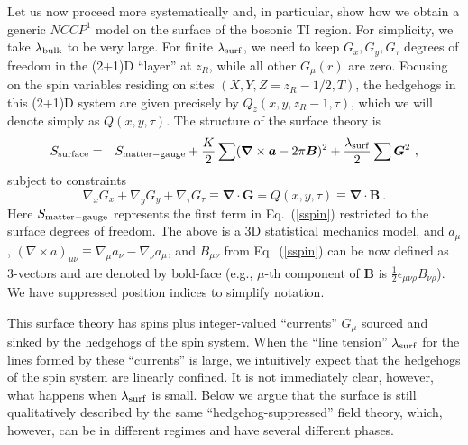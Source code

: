 Let us now proceed more systematically and, in particular, show how we obtain a generic $NCCP^1$ model on the surface of the bosonic TI region.  For simplicity, we take $\lambda_{\rm bulk}$ to be very large. For finite $\lambda_{\rm surf}$, we need to keep $G_x, G_y, G_\tau$ degrees of freedom in the (2+1)D ``layer'' at $z_R$, while all other $G_\mu(r)$ are zero.  Focusing on the spin variables residing on sites $(X, Y, Z=z_R-1/2, T)$, the hedgehogs in this (2+1)D system are given precisely by $Q_z(x, y, z_R-1, \tau)$, which we will denote simply as $Q(x, y, \tau)$.  The structure of the surface theory is
\begin{eqnarray}
S_{\rm surface} &=& S_{\rm matter-gauge} + \frac{K}{2}\sum  ({\bm\nabla} \times {\bm a} - 2\pi {\bm B})^2
+ \frac{\lambda_{\rm surf}}{2}\sum  {\bm G}^2 ~,
\label{Ssurf}
\end{eqnarray}
subject to constraints
\begin{equation}
 \nabla_x G_x + \nabla_y G_y + \nabla_\tau G_\tau \equiv {\bm \nabla} \cdot {\bm G} = Q(x,y,\tau) \equiv {\bm \nabla} \cdot {\bm B} ~.
\end{equation}
Here $S_{\rm matter-gauge}$ represents the first term in Eq.~(\ref{sspin}) restricted to the surface degrees of freedom. The above is a 3D statistical mechanics model, and $a_\mu$, $(\nabla\times a)_{\mu\nu} \equiv \nabla_\mu a_\nu -\nabla_\nu a_\mu$, and $B_{\mu\nu}$ from Eq.~(\ref{sspin}) can be now defined as 3-vectors and are denoted by bold-face (e.g., $\mu$-th component of ${\bm B}$ is $\frac{1}{2}\epsilon_{\mu\nu\rho}B_{\nu\rho}$). We have suppressed position indices to simplify notation.

This surface theory has spins plus integer-valued ``currents'' $G_\mu$ sourced and sinked by the hedgehogs of the spin system.  When the ``line tension'' $\lambda_{\rm surf}$ for the lines formed by these ``currents'' is large, we intuitively expect that the hedgehogs of the spin system are linearly confined.  It is not immediately clear, however, what happens when $\lambda_{\rm surf}$ is small.  Below we argue that the surface is still qualitatively described by the same ``hedgehog-suppressed'' field theory, which, however, can be in different regimes and have several different phases.


